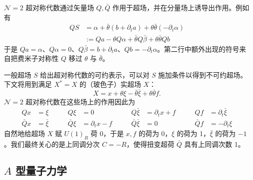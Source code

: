 $\mathcal{N}=2$ 超对称代数通过矢量场 $Q,\bar Q$ 作用于超场，并在分量场上诱导出作用。例如有
\begin{equation}\tag{B.6}
\begin{aligned}
QS &= \alpha + \bar\theta(b+\partial_t a) + \theta\bar\theta(-\partial_t\alpha)\\
&:= Qa - \theta Q\alpha + \bar\theta Q\bar\beta + \theta\bar\theta Qb
\end{aligned}
\end{equation}
于是 $Qa=\alpha$、$Q\alpha=0$、$Q\bar\beta=b+\partial_t a$、$Qb=-\partial_t\alpha$。第二行中额外出现的符号来自把费米子对称性 $Q$ 移过 $\theta$ 与 $\bar\theta$。

一般超场 $S$ 给出超对称代数的可约表示，可以对 $S$ 施加条件以得到不可约超场。下文将用到满足 $X^*=X$ 的（玻色子）实超场 $X$：
\begin{equation}\tag{B.7}
X = x + \theta\xi - \bar\theta\bar\xi + \theta\bar\theta f.
\end{equation}
$\mathcal{N}=2$ 超对称代数在这些场上的作用因此为
\begin{equation}\tag{B.8}
\begin{aligned}
Qx &= \xi &\qquad Q\xi &= 0 &\qquad Q\bar\xi &= \partial_t x + f &\qquad Qf &= \partial_t\bar\xi\\
\bar Qx &= \bar\xi &\qquad \bar Q\xi &= \partial_t x - f &\qquad \bar Q\bar\xi &= 0 &\qquad \bar Qf &= -\partial_t\xi
\end{aligned}
\end{equation}
自然地给超场 $X$ 赋 $U(1)_R$ 荷 0，于是 $x,f$ 的荷为 0，$\xi$ 的荷为 1，$\bar\xi$ 的荷为 $-1$。我们最终关心的是上同调分次 $C=-R$，使得扭变超荷 $\bar Q$ 具有上同调次数 1。

\subsection{$A$ 型量子力学}

